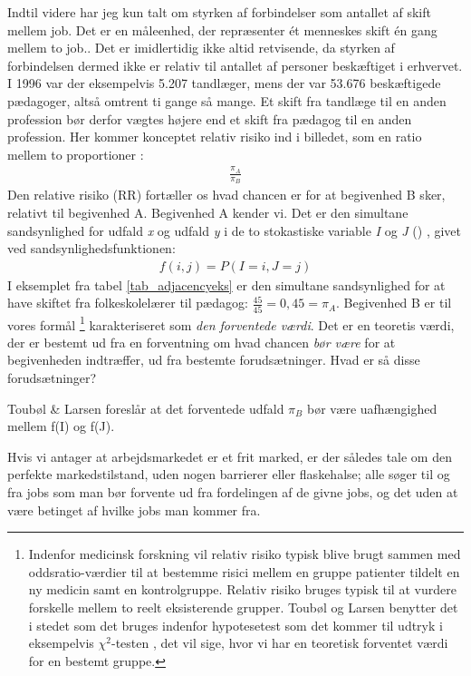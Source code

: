 Indtil videre har jeg kun talt om styrken af forbindelser som antallet af skift mellem job. Det er en måleenhed, der repræsenter ét menneskes skift én gang mellem to job.. Det er imidlertidig ikke altid retvisende, da styrken af forbindelsen dermed ikke er relativ til antallet af personer beskæftiget i erhvervet. I 1996 var der eksempelvis 5.207 tandlæger, mens der var 53.676 beskæftigede pædagoger, altså omtrent ti gange så mange. Et skift fra tandlæge til en anden profession bør derfor vægtes højere end et skift fra pædagog til en anden profession.  Her kommer konceptet relativ risiko ind i billedet, som en ratio mellem to proportioner \parencite[244, 271]{Agresti1997}: 
%
\begin{align} 
\frac{\pi_{A}}{\pi_{B}}
\end{align} 
%
Den relative risiko (RR) fortæller os hvad chancen er for at begivenhed B sker, relativt til begivenhed A. Begivenhed A kender vi. Det er den simultane sandsynlighed for udfald \emph{x} og udfald \emph{y} i de to stokastiske variable \emph{I} og \emph{J} () \parencite[41]{Malchow-MoellerWuertz2010}, givet ved sandsynlighedsfunktionen:
%
\begin{align} 
f(i,j) = P(I=i, J=j)
\end{align} 
%
I eksemplet fra tabel \ref{tab_adjacencyeks} er den simultane sandsynlighed for at have skiftet fra folkeskolelærer til pædagog: $\frac{45}{45} = 0,45 = \pi_{A}$. Begivenhed B er til vores formål%
%
\footnote{Indenfor medicinsk forskning vil relativ risiko typisk blive brugt sammen med oddsratio-værdier til at bestemme risici mellem en gruppe patienter tildelt en ny medicin samt en kontrolgruppe. Relativ risiko bruges typisk til at vurdere forskelle mellem to reelt eksisterende grupper. Toubøl og Larsen benytter det i stedet som det bruges indenfor hypotesetest som det kommer til udtryk i eksempelvis $\chi^{2}$-testen \parencite[205]{Malchow-MoellerWuertz2010}, det vil sige, hvor vi har en teoretisk forventet værdi for en bestemt gruppe.}%
%
karakteriseret som \emph{den forventede værdi}. Det er en teoretis værdi, der er bestemt ud fra en forventning om hvad chancen \emph{bør være} for at begivenheden indtræffer, ud fra bestemte forudsætninger. Hvad er så disse forudsætninger?

Toubøl \& Larsen foreslår at det forventede udfald $\pi_{B}$ bør være uafhængighed mellem f(I) og f(J).

Hvis vi antager at arbejdsmarkedet er et frit marked, er der således tale om den perfekte markedstilstand, uden nogen barrierer eller flaskehalse; alle søger til og fra jobs som man bør forvente ud fra fordelingen af de givne jobs, og det uden at være betinget af hvilke jobs man kommer fra.

